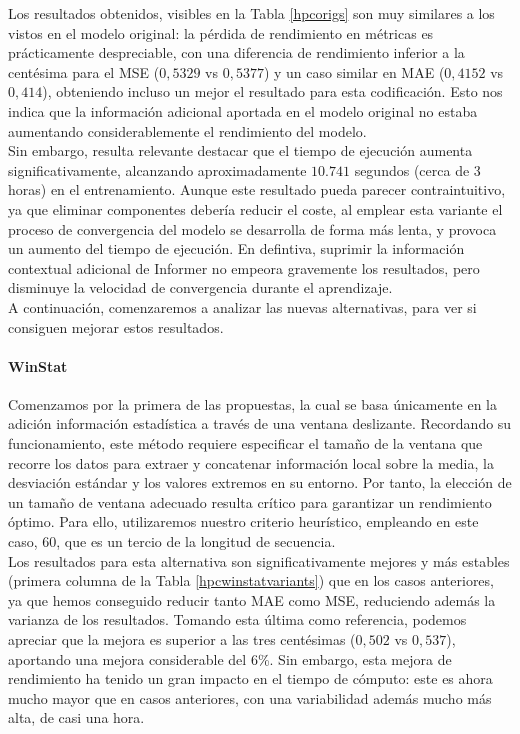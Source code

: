 Los resultados obtenidos, visibles en la Tabla \ref{hpcorigs} son muy similares a los vistos en el modelo original: la pérdida de rendimiento en métricas es prácticamente despreciable, con una diferencia de rendimiento inferior a la centésima para el MSE ($0,5329$ vs $0,5377$) y un caso similar en MAE ($0,4152$ vs $0,414$), obteniendo incluso un mejor el resultado para esta codificación. Esto nos indica que la información adicional aportada en el modelo original no estaba aumentando considerablemente el rendimiento del modelo.\\

Sin embargo, resulta relevante destacar que el tiempo de ejecución aumenta significativamente, alcanzando aproximadamente $10.741$ segundos (cerca de 3 horas) en el entrenamiento. Aunque este resultado pueda parecer contraintuitivo, ya que eliminar componentes debería reducir el coste, al emplear esta variante el proceso de convergencia del modelo se desarrolla de forma más lenta, y provoca un aumento del tiempo de ejecución. En defintiva, suprimir la información contextual adicional de Informer no empeora gravemente los resultados, pero disminuye la velocidad de convergencia durante el aprendizaje.\\

A continuación, comenzaremos a analizar las nuevas alternativas, para ver si consiguen mejorar estos resultados.

\paragraph{WinStat}

Comenzamos por la primera de las propuestas, la cual se basa únicamente en la adición información estadística a través de una ventana deslizante. Recordando su funcionamiento, este método requiere especificar el tamaño de la ventana que recorre los datos para extraer y concatenar información local sobre la media, la desviación estándar y los valores extremos en su entorno. Por tanto, la elección de un tamaño de ventana adecuado resulta crítico para garantizar un rendimiento óptimo. Para ello, utilizaremos nuestro criterio heurístico, empleando en este caso, 60, que es un tercio de la longitud de secuencia.\\

Los resultados para esta alternativa son significativamente mejores y más estables (primera columna de la Tabla \ref{hpcwinstatvariants}) que en los casos anteriores, ya que hemos conseguido reducir tanto MAE como MSE, reduciendo además la varianza de los resultados. Tomando esta última como referencia, podemos apreciar que la mejora es superior a las tres centésimas ($0,502$ vs $0,537$), aportando una mejora considerable del 6\%. Sin embargo, esta mejora de rendimiento ha tenido un gran impacto en el tiempo de cómputo: este es ahora mucho mayor que en casos anteriores, con una variabilidad además mucho más alta, de casi una hora.\\

